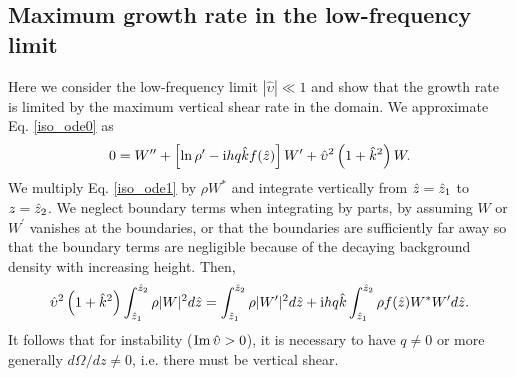 \subsection{Maximum growth rate  in the low-frequency limit}
Here we consider the low-frequency limit $|\hat{\upsilon}|\ll 1$ and 
show that the growth rate is limited by the maximum vertical
shear rate in the domain. 
We approximate Eq. \ref{iso_ode0} as 
\begin{align}
  0 = W^{\prime\prime} + \left[\ln\rho^\prime - \mathrm{i} h q \hat{k}
    f(\hat{z})\right]W^\prime +
  \hat{\upsilon}^2\left(1+\hat{k}^2\right)W. \label{iso_ode1}
\end{align}
We multiply Eq. \ref{iso_ode1} by $\rho W^*$ and integrate vertically from
$\hat{z}=\hat{z}_1$ to $z=\hat{z}_2$. We neglect boundary 
terms when integrating by parts, by assuming $W$ or
$W^\prime$ vanishes at the boundaries, or that the boundaries are 
sufficiently far away so that the boundary terms are negligible because of the
decaying background density with increasing height. Then,
\begin{align}
  \hat{\upsilon}^2\left(1+\hat{k}^2\right)\int_{\hat{z}_1}^{\hat{z}_2}\rho|W|^2d\hat{z}
  =\int_{\hat{z}_1}^{\hat{z}_2}\rho|W^\prime|^2d\hat{z} 
  +\mathrm{i} h q \hat{k}\int_{\hat{z}_1}^{\hat{z}_2}\rho f(\hat{z}) W^*W^\prime d\hat{z}.\label{integral_relation1}
\end{align}
It follows that for instability ($\operatorname{Im}\hat{\upsilon}>0$), it is necessary to
have $q\neq0$ or more generally $d\Omega/dz\neq 0$, i.e. there must
be vertical shear. 

